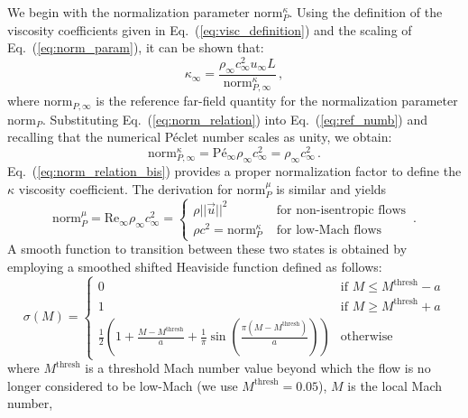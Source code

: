 \documentclass[review,10pt]{elsarticle}
\newcommand{\norm}{\textrm{norm}}
\renewcommand{\Re}{\textrm{Re}}
\newcommand{\Pe}{\textrm{P\'e}}
\newcommand{\eqt}[1]{Eq.~(\ref{#1})}                     %
\begin{document}
We begin with the  normalization parameter $\norm_P^\kappa$. Using the 
definition of the viscosity coefficients given in \eqt{eq:visc_definition} and the scaling of 
\eqt{eq:norm_param}, it can be shown that:
%
\begin{equation}
\label{eq:norm_relation}
\kappa_\infty = \frac{ \rho_\infty c_\infty^2 u_\infty L }{ \norm_{P,\infty}^{\kappa} } \, ,
\end{equation}
%
where $\norm_{P,\infty}$ is the reference far-field quantity for the normalization parameter $\norm_P$. 
Substituting \eqt{eq:norm_relation} into \eqt{eq:ref_numb} and recalling that the numerical P\'eclet 
number scales as unity, we obtain:
%
\begin{equation}
\label{eq:norm_relation_bis}
\norm_{P,\infty}^{\kappa} = \Pe_\infty \rho_\infty c_\infty^2 = \rho_\infty c_\infty^2 \, .
\end{equation}
%
\eqt{eq:norm_relation_bis} provides a proper normalization factor to define the $\kappa$ viscosity coefficient.
%
The derivation for $\norm_P^\mu$ is similar and yields
\begin{equation}
\label{eq:norm_ent2}
\norm_P^\mu = \Re_\infty \rho_\infty c_\infty^2 =  \left\{
\begin{array}{ll}
 \rho ||\vec{u} ||^2       & \text{ for non-isentropic flows} \\
 \rho c^2 = \norm_P^\kappa & \text{ for low-Mach flows}
\end{array}
\right. \,.
\end{equation}
A smooth function to transition between these two states is obtained by employing a smoothed shifted Heaviside function
defined as follows: %
\begin{equation}
\sigma(M) =
\left\{
\begin{array}{ll}
0 & \text{if } M \le M^\text{thresh} - a \\
1 & \text{if } M \ge M^\text{thresh} + a \\
\tfrac{1}{2} \left( 1 + \tfrac{M-M^\text{thresh}}{a} + \tfrac{1}{\pi} \sin \left(\tfrac{\pi(M-M^\text{thresh})}{a}\right) \right) & \text{otherwise}
\end{array}
\right.
\end{equation}
where $M^\text{thresh}$ is a threshold Mach number value beyond which the flow is no longer 
considered  to be low-Mach (we use $M^\text{thresh}=0.05$), $M$ is the local Mach number, 
\end{document}
